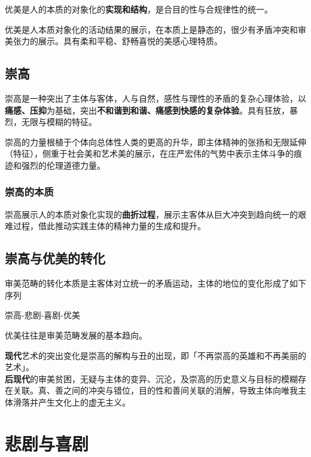 \documentclass{NoteThesis/note-thesis}
\begin{document}
优美是人的本质的对象化的\textbf{实现和结构}，是合目的性与合规律性的统一。

优美是人本质对象化的活动结果的展示，在本质上是静态的，很少有矛盾冲突和审美张力的展示。具有柔和平稳、舒畅喜悦的美感心理特质。

\subsection{崇高}

崇高是一种突出了主体与客体，人与自然，感性与理性的矛盾的复杂心理体验，以\textbf{痛感、压抑}为基础，突出\textbf{不和谐到和谐、痛感到快感的复杂体验}。具有狂放，暴烈，无限与模糊的特征。

崇高的力量根植于个体向总体性人类的更高的升华，即主体精神的张扬和无限延伸（特征），侧重于社会美和艺术美的展示，在庄严宏伟的气势中表示主体斗争的痕迹和强烈的伦理道德力量。

\subsubsection{崇高的本质}

崇高展示人的本质对象化实现的\textbf{曲折过程}，展示主客体从巨大冲突到趋向统一的艰难过程，借此推动实践主体的精神力量的生成和提升。

\subsection{崇高与优美的转化}

审美范畴的转化本质是主客体对立统一的矛盾运动，主体的地位的变化形成了如下序列

\begin{center}
    崇高-悲剧-喜剧-优美
\end{center}

优美往往是审美范畴发展的基本趋向。

\begin{mynote_env}[frametitle={现代与后现代的审美范畴}]
    \textbf{现代}艺术的突出变化是崇高的解构与丑的出现，即「不再崇高的英雄和不再美丽的艺术」。\\
    \textbf{后现代}的审美贫困，无疑与主体的变异、沉沦，及崇高的历史意义与目标的模糊存在关联。真、善之间的冲突与错位，目的性和善间关联的消解，导致主体向唯我主体滑落并产生文化上的虚无主义。
\end{mynote_env}

\section{悲剧与喜剧}
\end{document}
